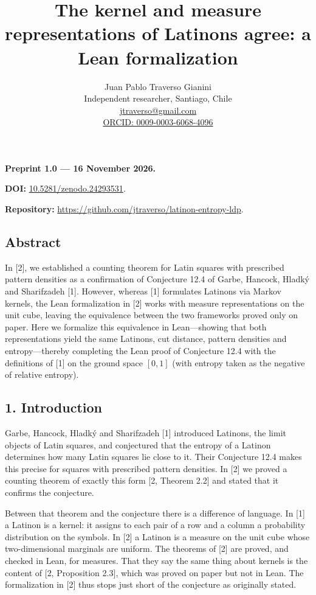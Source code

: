 \documentclass[english,11pt,a4paper]{article}
\title{The kernel and measure representations of Latinons agree: a Lean formalization}
\author{Juan Pablo Traverso Gianini\\\small Independent researcher, Santiago, Chile\\\small \href{mailto:jtraverso@gmail.com}{jtraverso@gmail.com}\\\small \href{https://orcid.org/0009-0003-6068-4096}{ORCID: 0009-0003-6068-4096}}
\date{}
\begin{document}
\raggedbottom\maketitle
\textbf{Preprint 1.0 --- 16 November 2026.}

\textbf{DOI:} \href{https://doi.org/10.5281/zenodo.24293531}{10.5281/zenodo.24293531}.

\textbf{Repository:} \url{https://github.com/jtraverso/latinon-entropy-ldp}.

\subsection{Abstract}\label{abstract}

In {[}2{]}, we established a counting theorem for Latin squares with prescribed pattern densities as a confirmation of Conjecture 12.4 of Garbe, Hancock, Hladký and Sharifzadeh {[}1{]}. However, whereas {[}1{]} formulates Latinons via Markov kernels, the Lean formalization in {[}2{]} works with measure representations on the unit cube, leaving the equivalence between the two frameworks proved only on paper. Here we formalize this equivalence in Lean---showing that both representations yield the same Latinons, cut distance, pattern densities and entropy---thereby completing the Lean proof of Conjecture 12.4 with the definitions of {[}1{]} on the ground space \([0,1]\) (with entropy taken as the negative of relative entropy).

\subsection{1. Introduction}\label{introduction}

Garbe, Hancock, Hladký and Sharifzadeh {[}1{]} introduced Latinons, the limit objects of Latin squares, and conjectured that the entropy of a Latinon determines how many Latin squares lie close to it. Their Conjecture 12.4 makes this precise for squares with prescribed pattern densities. In {[}2{]} we proved a counting theorem of exactly this form {[}2, Theorem 2.2{]} and stated that it confirms the conjecture.

Between that theorem and the conjecture there is a difference of language. In {[}1{]} a Latinon is a kernel: it assigns to each pair of a row and a column a probability distribution on the symbols. In {[}2{]} a Latinon is a measure on the unit cube whose two-dimensional marginals are uniform. The theorems of {[}2{]} are proved, and checked in Lean, for measures. That they say the same thing about kernels is the content of {[}2, Proposition 2.3{]}, which was proved on paper but not in Lean. The formalization in {[}2{]} thus stops just short of the conjecture as originally stated.
\end{document}
